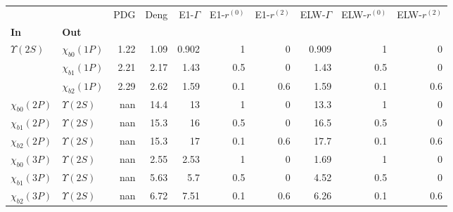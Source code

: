 \begin{tabular}{l|l|r|r|r|r|r|r|r|r}
\toprule
                &                &  PDG &  Deng &  E1-$\Gamma$ &  E1-$r^{(0)}$ &  E1-$r^{(2)}$ &  ELW-$\Gamma$ &  ELW-$r^{(0)}$ &  ELW-$r^{(2)}$ \\
\textbf{In} & \textbf{Out} &      &       &              &               &               &               &                &                \\
\midrule
\textbf{$\Upsilon(2S)$} & \textbf{$\chi_{b0}(1P)$} & 1.22 &  1.09 &        0.902 &             1 &             0 &         0.909 &              1 &              0 \\
                & \textbf{$\chi_{b1}(1P)$} & 2.21 &  2.17 &         1.43 &           0.5 &             0 &          1.43 &            0.5 &              0 \\
                & \textbf{$\chi_{b2}(1P)$} & 2.29 &  2.62 &         1.59 &           0.1 &           0.6 &          1.59 &            0.1 &            0.6 \\
\textbf{$\chi_{b0}(2P)$} & \textbf{$\Upsilon(2S)$} &  nan &  14.4 &           13 &             1 &             0 &          13.3 &              1 &              0 \\
\textbf{$\chi_{b1}(2P)$} & \textbf{$\Upsilon(2S)$} &  nan &  15.3 &           16 &           0.5 &             0 &          16.5 &            0.5 &              0 \\
\textbf{$\chi_{b2}(2P)$} & \textbf{$\Upsilon(2S)$} &  nan &  15.3 &           17 &           0.1 &           0.6 &          17.7 &            0.1 &            0.6 \\
\textbf{$\chi_{b0}(3P)$} & \textbf{$\Upsilon(2S)$} &  nan &  2.55 &         2.53 &             1 &             0 &          1.69 &              1 &              0 \\
\textbf{$\chi_{b1}(3P)$} & \textbf{$\Upsilon(2S)$} &  nan &  5.63 &          5.7 &           0.5 &             0 &          4.52 &            0.5 &              0 \\
\textbf{$\chi_{b2}(3P)$} & \textbf{$\Upsilon(2S)$} &  nan &  6.72 &         7.51 &           0.1 &           0.6 &          6.26 &            0.1 &            0.6 \\
\bottomrule
\end{tabular}
